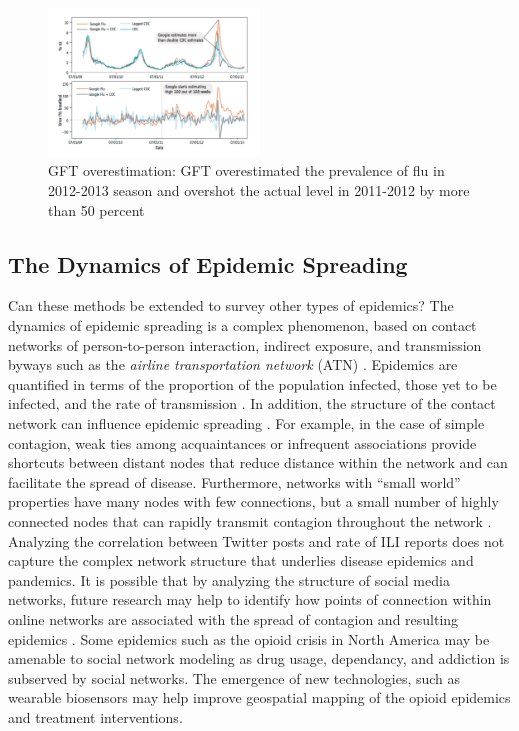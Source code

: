\documentclass[sigconf]{acmart}
\begin{document}
\begin{figure}
  \centering
  \includegraphics[width=0.5\textwidth]{images/Figure5.pdf}
  \caption{GFT overestimation: GFT overestimated the prevalence of flu in 2012-2013 season
  and overshot the actual level in 2011-2012 by more than 50 percent \cite{lazer14}} 
  \label{fig:Figure5} 
\end{figure}

\subsection{The Dynamics of Epidemic Spreading} 

Can these methods be extended to survey other types of epidemics? The dynamics of epidemic 
spreading is a complex phenomenon, based on contact networks of person-to-person interaction, 
indirect exposure, and transmission byways such as the {\it airline transportation network} 
(ATN) \cite{Colizza06}. Epidemics are quantified in terms of the proportion of the population 
infected, those yet to be infected, and the rate of transmission \cite{hethcote00}. In 
addition, the structure of the contact network can influence epidemic spreading 
\cite{pastor01}. For example, in the case of simple contagion, weak ties among acquaintances 
or infrequent associations provide shortcuts between distant nodes that reduce distance within 
the network \cite{granovetter73} and can facilitate the spread of disease. Furthermore, 
networks with ``small world'' properties have many nodes with few connections, but a small 
number of highly connected nodes that can rapidly transmit contagion throughout the network 
\cite{watts98}. Analyzing the correlation between Twitter posts and rate of ILI reports does 
not capture the complex network structure that underlies disease epidemics and pandemics. 
It is possible that by analyzing the structure of social media networks, future research 
may help to identify how points of connection within online networks are associated with 
the spread of contagion and resulting epidemics \cite{zhu17}. Some epidemics such as the
opioid crisis in North America \cite{volkow14} may be amenable to social network modeling
as drug usage, dependancy, and addiction is subserved by social networks. The emergence of 
new technologies, such as wearable biosensors \cite{carreiro15} may help improve geospatial 
mapping of the opioid epidemics and treatment interventions.
\end{document}
